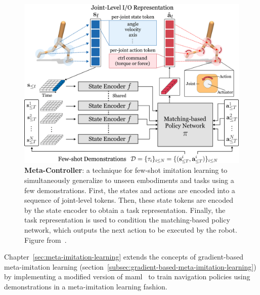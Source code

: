 \begin{figure}
    \centering
    \includegraphics[width=\textwidth]{figures/related_work/transformer_mil}
    \caption[Meta-Controller]{\textbf{Meta-Controller}: a technique for few-shot imitation learning to simultaneously generalize to unseen embodiments and tasks using a few demonstrations.
    First, the states and actions are encoded into a sequence of joint-level tokens.
    Then, these state tokens are encoded by the state encoder to obtain a task representation.
    Finally, the task representation is used to condition the matching-based policy network, which outputs the next action to be executed by the robot.
    Figure from~\cite{cho2024metacontroller}.}
    \label{fig:transformer-mil}
\end{figure}

Chapter~\ref{sec:meta-imitation-learning} extends the concepts of gradient-based meta-imitation learning (section~\ref{subsec:gradient-based-meta-imitation-learning}) by implementing a modified version of \acrshort{maml}~\cite{finn2017} to train navigation policies using demonstrations in a meta-imitation learning fashion.
